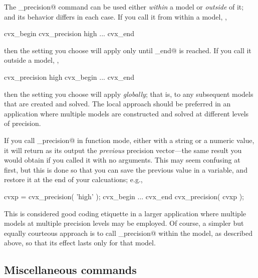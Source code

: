 \documentclass[12pt]{article}
\begin{document}
The \verb@cvx_precision@ command can be used either \emph{within} a \cvx model or
\emph{outside} of it; and its behavior differs in each case. If you call it from
within a model, \eg,
\begin{code}
	cvx_begin
	    cvx_precision high
	    ...
	cvx_end
\end{code}
then the setting you choose will apply only until \verb@cvx_end@ is reached. If you call it outside
a model, \eg,
\begin{code}
	cvx_precision high
	cvx_begin
	    ...
	cvx_end
\end{code}
then the setting you choose will apply \emph{globally}; that is, to any
subsequent models that are created and solved. The local approach should be
preferred in an application where multiple models are constructed and solved
at different levels of precision.

If you call \verb@cvx_precision@ in function mode, either with a string or a numeric
value, it will return as its output the \emph{previous} precision vector---the same
result you would obtain if you called it with no arguments. This may
seem confusing at first, but this is done so that you can save the previous value
in a variable, and restore it at the end of your calcuations; e.g.,
\begin{code}
	cvxp = cvx_precision( 'high' );
	cvx_begin
		...
	cvx_end
	cvx_precision( cvxp );
\end{code}
This is considered good coding etiquette in a larger application where multiple 
\cvx models at multiple precision levels may be employed. Of course, a simpler but
equally courteous approach is to call \verb@cvx_precision@ within the \cvx
model, as described above, so that its effect lasts only for that model.

\subsection{Miscellaneous \cvx commands}
\end{document}
